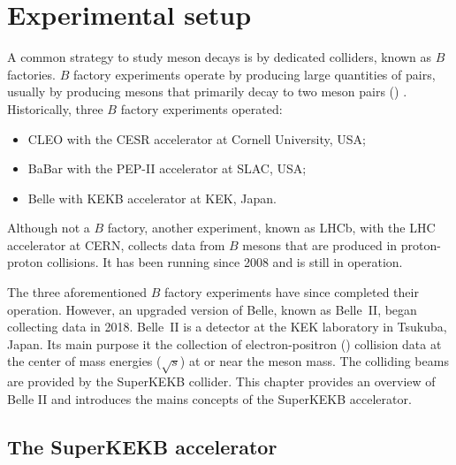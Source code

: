 \chapter{Experimental setup}

A common strategy to study \B meson decays is by dedicated colliders, known as $B$ factories.
$B$ factory experiments operate by producing large quantities of \BB pairs, usually by producing \FourS mesons that primarily decay to two \B meson pairs (\BB) \cite{Workman:2022ynf}.
Historically, three $B$ factory experiments operated:
\begin{itemize}
    \item CLEO with the CESR accelerator at Cornell University, USA;
    \item BaBar with the PEP-II accelerator at SLAC, USA;
    \item Belle with KEKB accelerator at KEK, Japan.
\end{itemize}
Although not a $B$ factory, another experiment, known as LHCb, with the LHC accelerator at CERN, collects data from $B$ mesons that are produced in proton-proton collisions.
It has been running since 2008 and is still in operation.

The three aforementioned $B$ factory experiments have since completed their operation.
However, an upgraded version of Belle, known as Belle~II, began collecting data in 2018.
Belle~II is a detector at the KEK laboratory in Tsukuba, Japan.
Its main purpose it the collection of electron-positron (\epem) collision data 
at the center of mass energies ($\sqrt{s}$) at or near the \FourS meson mass.
The colliding beams are provided by the SuperKEKB \epem collider.
This chapter provides an overview of Belle II and introduces the mains concepts of the SuperKEKB accelerator.


\section{The SuperKEKB accelerator}

